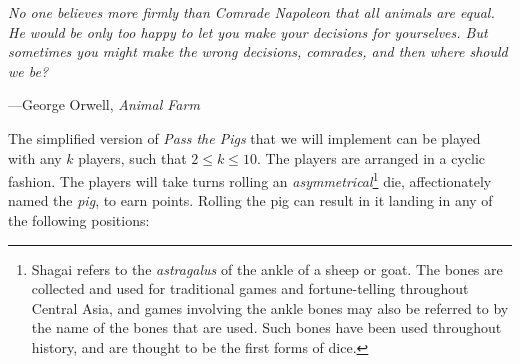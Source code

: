 \documentclass{article}
\begin{document}
\textwidth \epigraph{\emph{No one believes more
firmly than Comrade Napoleon that all animals are equal. He would be
only too happy to let you make your decisions for yourselves. But
sometimes you might make the wrong decisions, comrades, and then where
should we be?}}{---George Orwell, \emph{Animal Farm}}

\noindent The simplified version of \emph{Pass the Pigs} that we will
implement can be played with any $k$ players, such that $2 \le k \le
10$. The players are arranged in a cyclic fashion. The players will take
turns rolling an \emph{asymmetrical}\footnote{
        Shagai refers to the \emph{astragalus} of the ankle of a sheep or goat.
The bones are collected and used for traditional games and
fortune-telling throughout Central Asia, and games involving the
ankle bones may also be referred to by the name of the bones that are used.
Such bones have been used throughout
history, and are thought to be the first forms of dice.
}
die, affectionately named the \emph{pig},
to earn points. Rolling the pig can result in it landing in any of the
following positions:
\end{document}
